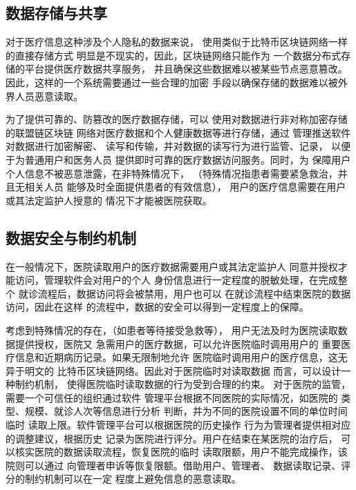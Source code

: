 \documentclass[UTF8]{ctexart}
\begin{document}
    \subsection{数据存储与共享}
    \par
    对于医疗信息这种涉及个人隐私的数据来说，
    使用类似于比特币区块链网络一样的直接存储方式
    明显是不现实的，因此，区块链网络只能作为
    一个数据分布式存储的平台提供医疗数据共享服务，
    并且确保这些数据难以被某些节点恶意篡改。
    因此，这样的一个系统需要通过一些合理的加密
    手段以确保存储的数据难以被外界人员恶意读取。
    \par
    为了提供可靠的、防篡改的医疗数据存储，可以
    使用对数据进行非对称加密存储的联盟链区块链
    网络对医疗数据和个人健康数据等进行存储，通过
    管理推送软件对数据进行加密解密、
    读写和传输，并对数据的读写行为进行监管、记录，
    以便于为普通用户和医务人员
    提供即时可靠的医疗数据访问服务。同时，为
    保障用户个人信息不被恶意泄露，在非特殊情况下，
    （特殊情况指患者需要紧急救治，并且无相关人员
    能够及时全面提供患者的有效信息），
    用户的医疗信息需要在用户或其法定监护人授意的
    情况下才能被医院获取。
    \subsection{数据安全与制约机制}
    \par
    在一般情况下，医院读取用户的医疗数据需要用户或其法定监护人
    同意并授权才能访问，管理软件会对用户的个人
    身份信息进行一定程度的脱敏处理，在完成整个
    就诊流程后，数据访问将会被禁用，用户也可以
    在就诊流程中结束医院的数据访问，因此在这样
    的流程中，数据的安全可以得到一定程度上的保障。
    
    \par
    考虑到特殊情况的存在，（如患者等待接受急救等），
    用户无法及时为医院读取数据提供授权，医院又
    急需用户的医疗数据，可以允许医院临时调用用户的
    重要医疗信息和近期病历记录。如果无限制地允许
    医院临时调用用户的医疗信息，这无异于明文的
    比特币区块链网络。因此对于医院临时对读取数据
    而言，可以设计一种制约机制，
    使得医院临时读取数据的行为受到合理的约束。
    对于医院的监管，需要一个可信任的组织通过软件
    管理平台根据不同医院的实际情况，如医院的
    类型、规模、就诊人次等信息进行分析
    判断，并为不同的医院设置不同的单位时间临时
    读取上限。软件管理平台可以根据医院的历史操作
    行为为管理者提供相对应的调整建议，根据历史
    记录为医院进行评分。用户在结束在某医院的治疗后，
    可以核实医院的数据读取流程，恢复医院的临时
    读取限额，用户不能完成操作，该院则可以通过
    向管理者申诉等恢复限额。借助用户、管理者、
    数据读取记录、评分的制约机制可以在一定
    程度上避免信息的恶意读取。
\end{document}

